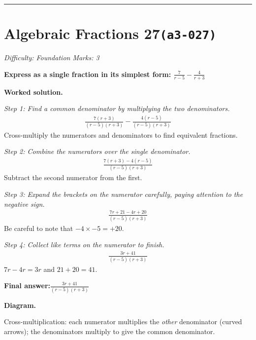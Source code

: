 \documentclass[11pt]{article}
\newcommand{\question}[1]{\par\medskip\noindent\textbf{#1}\par}
\begin{document}
\medskip\hrule

\section*{Algebraic Fractions 27\quad\small\texttt{(a3-027)}}
\textit{Difficulty: Foundation \quad\textbar\quad Marks: 3}

\question{Express as a single fraction in its simplest form: \( \frac{7}{r-5} - \frac{4}{r+3} \)}

\textbf{Worked solution.}

\textit{Step 1: Find a common denominator by multiplying the two denominators.}
\[\begin{gathered}
\frac{7(r+3)}{(r-5)(r+3)} - \frac{4(r-5)}{(r-5)(r+3)}
\end{gathered}\]
Cross-multiply the numerators and denominators to find equivalent fractions.

\textit{Step 2: Combine the numerators over the single denominator.}
\[\begin{gathered}
\frac{7(r+3) - 4(r-5)}{(r-5)(r+3)}
\end{gathered}\]
Subtract the second numerator from the first.

\textit{Step 3: Expand the brackets on the numerator carefully, paying attention to the negative sign.}
\[\begin{gathered}
\frac{7r + 21 - 4r + 20}{(r-5)(r+3)}
\end{gathered}\]
Be careful to note that \( -4 \times -5 = +20 \).

\textit{Step 4: Collect like terms on the numerator to finish.}
\[\begin{gathered}
\frac{3r + 41}{(r-5)(r+3)}
\end{gathered}\]
\( 7r - 4r = 3r \) and \( 21 + 20 = 41 \).

\begin{answerbox}
\textbf{Final answer:}\quad \(\displaystyle \frac{3r + 41}{(r-5)(r+3)}\)
\end{answerbox}
\textbf{Diagram.}

\begin{center}
\end{center}
\small Cross-multiplication: each numerator multiplies the \emph{other} denominator (curved arrows); the denominators multiply to give the common denominator.\normalsize
\end{document}
